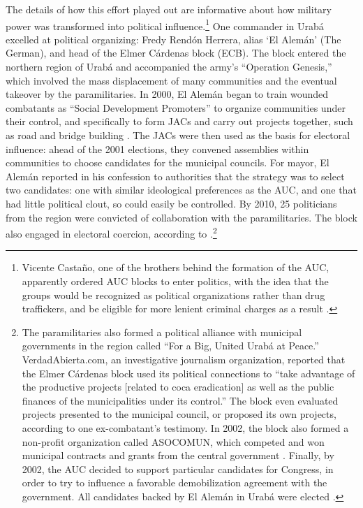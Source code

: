The details of how this effort played out are informative about how military power was transformed into political influence.\footnote{Vicente Casta\~{n}o, one of the brothers behind the formation of the AUC, apparently ordered AUC blocks to enter politics, with the idea that the groups would be recognized as political organizations rather than drug traffickers, and be eligible for more lenient criminal charges as a result \citep{ronderos14a}.} 
One commander in Urab\'{a} excelled at political organizing: Fredy Rend\'{o}n Herrera, alias `El Alem\'{a}n' (The German), and head of the Elmer C\'{a}rdenas block (ECB). The block entered the northern region of Urab\'{a} and accompanied the army's ``Operation Genesis,'' which involved the mass displacement of many communities and the eventual takeover by the paramilitaries. In 2000, El Alem\'{a}n began to train wounded combatants as ``Social Development Promoters'' to organize communities under their control, and specifically to form JACs and carry out projects together, such as road and bridge building \citep{verdad-abierta15b}. The JACs were then used as the basis for electoral influence: ahead of the 2001 elections, they convened assemblies within communities to choose candidates for the municipal councils. For mayor, El Alem\'{a}n reported in his confession to authorities that the strategy was to select two candidates: one with similar ideological preferences as the AUC, and one that had little political clout, so could easily be controlled. By 2010, 25 politicians from the region were convicted of collaboration with the paramilitaries. The block also engaged in electoral coercion, according to \citet{avila-martinez10a}.\footnote{The paramilitaries also formed a political alliance with municipal governments in the region called ``For a Big, United Urab\'{a} at Peace.'' VerdadAbierta.com, an investigative journalism organization, reported that the Elmer C\'{a}rdenas block used its political connections to ``take advantage of the productive projects [related to coca eradication] as well as the public finances of the municipalities under its control.'' The block even evaluated projects presented to the municipal council, or proposed its own projects, according to one ex-combatant's testimony. In 2002, the block also formed a non-profit organization called ASOCOMUN, which competed and won municipal contracts and grants from the central government \citep{verdad-abierta15b}. Finally, by 2002, the AUC decided to support particular candidates for Congress, in order to try to influence a favorable demobilization agreement with the government. All candidates backed by El Alem\'{a}n in Urab\'{a} were elected \citep{verdad-abierta11a}.} 

